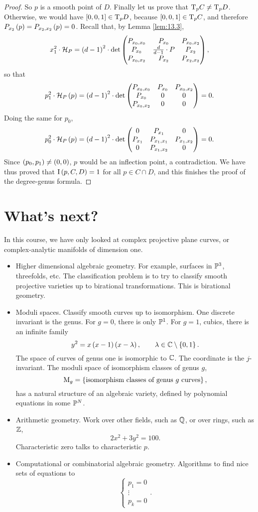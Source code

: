 \begin{proof}
So $ p $ is a smooth point of $ D $. Finally let us prove that $ \mathrm{T}_p C \ne \mathrm{T}_p D $. Otherwise, we would have $ \sbr{0, 0, 1} \in \T_p D $, because $ \sbr{0, 0, 1} \in \T_p C $, and therefore $ P_{x_2}\br{p} = P_{x_2, x_2}\br{p} = 0 $. Recall that, by Lemma \ref{lem:13.3},
$$ x_1^2 \cdot \HHH_P = \br{d - 1}^2 \cdot \det \threebythree{P_{x_0, x_0}}{P_{x_0}}{P_{x_0, x_2}}{P_{x_0}}{\tfrac{d}{d - 1} \cdot P}{P_{x_2}}{P_{x_0, x_2}}{P_{x_2}}{P_{x_2, x_2}}, $$
so that
$$ p_1^2 \cdot \HHH_P\br{p} = \br{d - 1}^2 \cdot \det \threebythree{P_{x_0, x_0}}{P_{x_0}}{P_{x_0, x_2}}{P_{x_0}}{0}{0}{P_{x_0, x_2}}{0}{0} = 0. $$
Doing the same for $ p_0 $,
$$ p_0^2 \cdot \HHH_P\br{p} = \br{d - 1}^2 \cdot \det \threebythree{0}{P_{x_1}}{0}{P_{x_1}}{P_{x_1, x_1}}{P_{x_1, x_2}}{0}{P_{x_1, x_2}}{0} = 0. $$
Since $ \br{p_0, p_1} \ne \br{0, 0} $, $ p $ would be an inflection point, a contradiction. We have thus proved that $ \I\br{p, C, D} = 1 $ for all $ p \in C \cap D $, and this finishes the proof of the degree-genus formula.
\end{proof}

\pagebreak

\appendix

\section{What's next?}

In this course, we have only looked at complex projective plane curves, or complex-analytic manifolds of dimension one.
\begin{itemize}
\item Higher dimensional algebraic geometry. For example, surfaces in $ \mathbb{P}^3 $, threefolds, etc. The classification problem is to try to classify smooth projective varieties up to birational transformations. This is birational geometry.
\item Moduli spaces. Classify smooth curves up to isomorphism. One discrete invariant is the genus. For $ g = 0 $, there is only $ \mathbb{P}^1 $. For $ g = 1 $, cubics, there is an infinite family
$$ y^2 = x\br{x - 1}\br{x - \lambda}, \qquad \lambda \in \CC \setminus \cbr{0, 1}. $$
The space of curves of genus one is isomorphic to $ \mathbb{C} $. The coordinate is the $ j $-invariant. The moduli space of isomorphism classes of genus $ g $,
$$ \M_g = \cbr{\text{isomorphism classes of genus} \ g \ \text{curves}}, $$
has a natural structure of an algebraic variety, defined by polynomial equations in some $ \mathbb{P}^N $.
\item Arithmetic geometry. Work over other fields, such as $ \mathbb{Q} $, or over rings, such as $ \mathbb{Z} $,
$$ 2x^2 + 3y^2 = 100. $$
Characteristic zero talks to characteristic $ p $.
\item Computational or combinatorial algebraic geometry. Algorithms to find nice sets of equations to
$$
\begin{cases}
p_1 = 0 \\
\vdots \\
p_k = 0
\end{cases}.
$$
\end{itemize}

